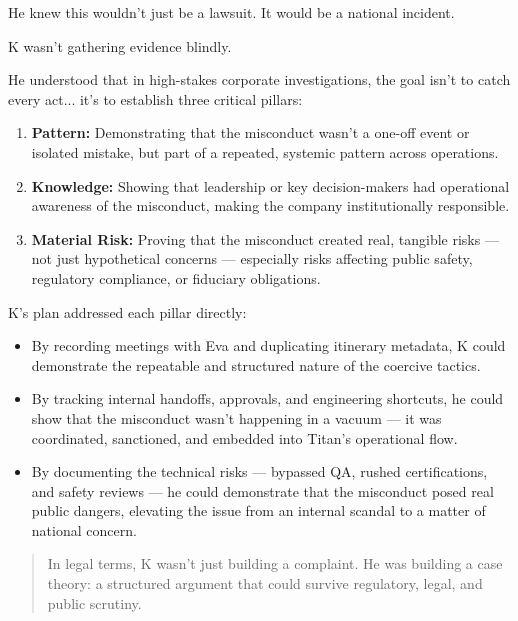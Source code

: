 He knew this wouldn’t just be a lawsuit.  It would be a national incident.

K wasn’t gathering evidence blindly.

He understood that in high-stakes corporate investigations, the goal isn’t to catch every act... it’s to establish three critical pillars:

\begin{enumerate}
    \item \textbf{Pattern:}  
    Demonstrating that the misconduct wasn’t a one-off event or isolated mistake,  
    but part of a repeated, systemic pattern across operations.
    
    \item \textbf{Knowledge:}  
    Showing that leadership or key decision-makers had operational awareness of the misconduct,  
    making the company institutionally responsible.
    
    \item \textbf{Material Risk:}  
    Proving that the misconduct created real, tangible risks — not just hypothetical concerns —  
    especially risks affecting public safety, regulatory compliance, or fiduciary obligations.
\end{enumerate}

K’s plan addressed each pillar directly:

\begin{itemize}
    \item By recording meetings with Eva and duplicating itinerary metadata,  
    K could demonstrate the repeatable and structured nature of the coercive tactics.
    
    \item By tracking internal handoffs, approvals, and engineering shortcuts,  
    he could show that the misconduct wasn’t happening in a vacuum — it was coordinated, sanctioned, and embedded into Titan’s operational flow.
    
    \item By documenting the technical risks — bypassed QA, rushed certifications, and safety reviews —  
    he could demonstrate that the misconduct posed real public dangers, elevating the issue from an internal scandal to a matter of national concern.
\end{itemize}

\begin{quote}
    In legal terms, K wasn’t just building a complaint.  
    He was building a case theory: a structured argument that could survive regulatory, legal, and public scrutiny.
\end{quote}

